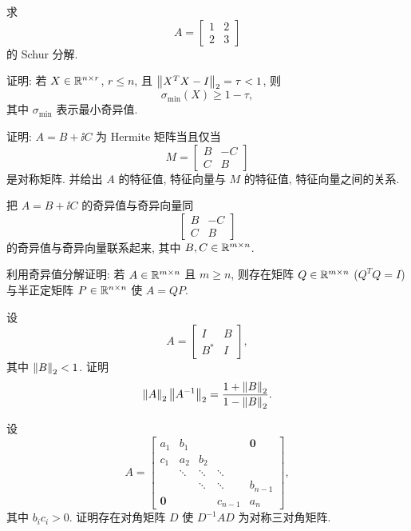 \begin{exercises}
  \item 求
    \[
      A=\begin{bmatrix}
        1 & 2\\
        2 & 3
      \end{bmatrix}
    \]
    的 Schur 分解.

  \item 证明: 若 $X\in\mathbb{R}^{n\times r}$, $r\leqslant n$, 且 $\left\|X^TX-I\right\|_2=\tau<1$, 则
    \[
      \sigma_{\min}(X)\geqslant1-\tau,
    \]
    其中 $\sigma_{\min}$ 表示最小奇异值.

  \item 证明: $A=B+\ii C$ 为 Hermite 矩阵当且仅当
    \[
      M=\begin{bmatrix}
        B & -C\\
        C & B
      \end{bmatrix}
    \]
    是对称矩阵. 并给出 $A$ 的特征值, 特征向量与 $M$ 的特征值, 特征向量之间的关系.

  \item 把 $A=B+\ii C$ 的奇异值与奇异向量同
    \[
      \begin{bmatrix}
        B & -C\\
        C & B
      \end{bmatrix}
    \]
    的奇异值与奇异向量联系起来, 其中 $B,C\in\mathbb{R}^{m\times n}$.

  \item 利用奇异值分解证明: 若 $A\in\mathbb{R}^{m\times n}$ 且 $m\geqslant n$, 则存在矩阵 $Q\in\mathbb{R}^{m\times n}$ ($Q^TQ=I$) 与半正定矩阵 $P\in\mathbb{R}^{n\times n}$ 使 $A=QP$.

  \item 设
    \[
      A=\begin{bmatrix}
        I & B\\
        B^* & I
      \end{bmatrix},
    \]
    其中 $\left\|B\right\|_2<1$. 证明
    \[
      \left\|A\right\|_2\left\|A^{-1}\right\|_2=\frac{1+\left\|B\right\|_2}{1-\left\|B\right\|_2}.
    \]

  \item 设
    \[
      A=\begin{bmatrix}
        a_1 & b_1 & & & \mathbf{0}\\
        c_1 & a_2 & b_2 & & \\
         & \ddots & \ddots & \ddots & \\
         & & \ddots & \ddots & b_{n-1}\\
        \mathbf{0} & & & c_{n-1} & a_n
      \end{bmatrix},
    \]
    其中 $b_ic_i>0$. 证明存在对角矩阵 $D$ 使 $D^{-1}AD$ 为对称三对角矩阵.


\end{exercises}
